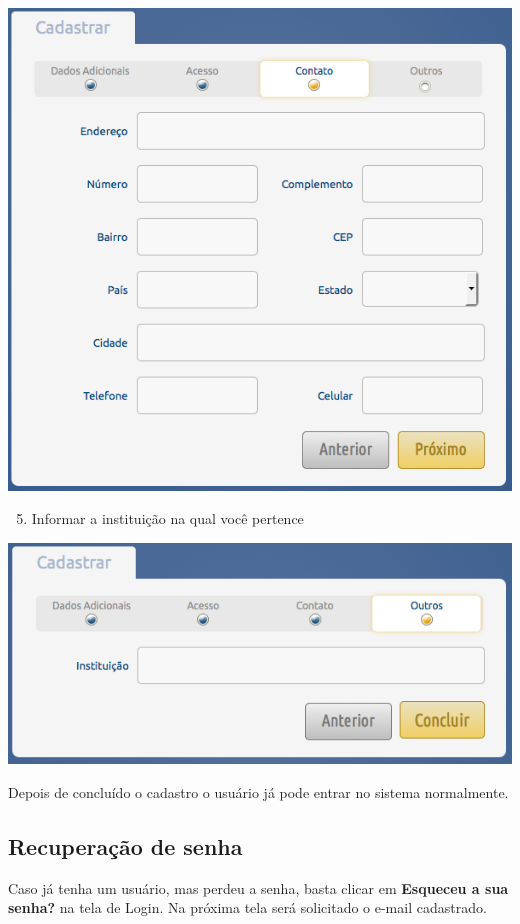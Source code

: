 \documentclass[letterpaper,10pt,english]{sphinxmanual}
\begin{document}
{\hfill\includegraphics{register-04.png}\hfill}
\begin{enumerate}
\setcounter{enumi}{4}
\item {} 
Informar a instituição na qual você pertence

\end{enumerate}

{\hfill\includegraphics{register-05.png}\hfill}

Depois de concluído o cadastro o usuário já pode entrar no sistema normalmente.


\subsection{Recuperação de senha}
\label{access:recuperacao-de-senha}\label{access:recuperar-senha}
Caso já tenha um usuário, mas perdeu a senha, basta clicar em \textbf{Esqueceu a sua senha?} na tela de Login. Na próxima tela será solicitado o e-mail cadastrado.
\end{document}
